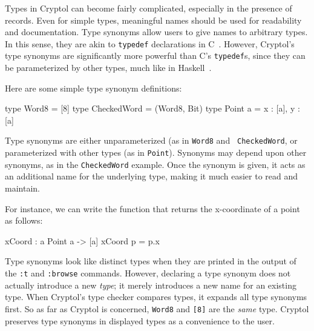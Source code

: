 

Types in Cryptol can become fairly complicated, especially in the
presence of records.  Even for simple types, meaningful names should
be used for readability and documentation.  Type synonyms allow users
to give names to arbitrary types.  In this sense, they are akin to
{\tt typedef} declarations in C~\cite{TheCProgrammingLanguage}.
However, Cryptol's type synonyms are significantly more powerful than
C's {\tt typedef}s, since they can be parameterized by other types,
much like in Haskell~\cite{Has98}.


Here are some simple type synonym definitions:
\begin{code}
  type Word8       = [8]
  type CheckedWord = (Word8, Bit)
  type Point a     = {x : [a], y : [a]}
\end{code}


Type synonyms are either unparameterized (as in {\tt Word8} and {\tt
  CheckedWord}, or parameterized with other types (as in {\tt Point}).
Synonyms may depend upon other synonyms, as in the {\tt CheckedWord}
example.  Once the synonym is given, it acts as an additional name for
the underlying type, making it much easier to read and
maintain.

For instance, we can write the function that returns the x-coordinate
of a point as follows:
\begin{code}
  xCoord : {a} Point a -> [a]
  xCoord p = p.x
\end{code}

Type synonyms look like distinct types when they are printed in the
output of the \texttt{:t} and \texttt{:browse} commands. However,
declaring a type synonym does not actually introduce a new
\emph{type}; it merely introduces a new name for an existing type.
When Cryptol's type checker compares types, it expands all type
synonyms first. So as far as Cryptol is concerned, \texttt{Word8} and
\texttt{[8]} are the \emph{same} type. Cryptol preserves type synonyms
in displayed types as a convenience to the user.

